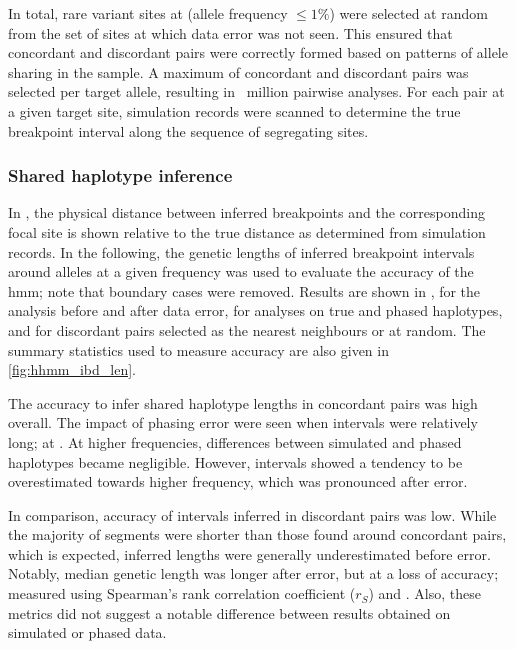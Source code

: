 In total,  rare variant sites at \fk{[2,50]} (allele frequency ${\leq 1\%}$) were selected at random from the set of sites at which data error was not seen.
This ensured that concordant and discordant pairs were correctly formed based on patterns of allele sharing in the sample.
A maximum of  concordant and  discordant pairs was selected per target allele, resulting in ~million pairwise analyses.
For each pair at a given target site, simulation records were scanned to determine the true breakpoint interval along the sequence of segregating sites.


%

%


%
\subsubsection{Shared haplotype inference}
%

In , the physical distance between inferred breakpoints and the corresponding focal site is shown relative to the true distance as determined from simulation records.
In the following, the genetic lengths of inferred breakpoint intervals around alleles at a given frequency was used to evaluate the accuracy of the \gls{hmm}; note that boundary cases were removed.
Results are shown in , for the analysis before and after data error, for analyses on true and phased haplotypes, and for discordant pairs selected as the nearest neighbours or at random.
The summary statistics used to measure accuracy are also given in \cref{fig:hhmm_ibd_len}.


%

%

The accuracy to infer shared haplotype lengths in concordant pairs was high overall.
The impact of phasing error were seen when intervals were relatively long; \eg at .
At higher frequencies, differences between simulated and phased haplotypes became negligible.
However, intervals showed a tendency to be overestimated towards higher frequency, which was pronounced after error.

In comparison, accuracy of intervals inferred in discordant pairs was low.
While the majority of segments were shorter than those found around concordant pairs, which is expected, inferred lengths were generally underestimated before error.
Notably, median genetic length was longer after error, but at a loss of accuracy; \eg measured using Spearman's rank correlation coefficient ($r_S$) and .
Also, these metrics did not suggest a notable difference between results obtained on simulated or phased data.

